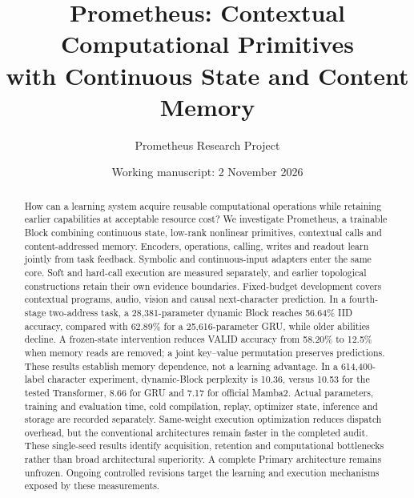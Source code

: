 \documentclass[10pt]{article}
\title{Prometheus: Contextual Computational Primitives\\with Continuous State and Content Memory}
\author{Prometheus Research Project}
\date{Working manuscript: 2 November 2026}
\begin{document}
\maketitle
\begin{abstract}
How can a learning system acquire reusable computational operations while
retaining earlier capabilities at acceptable resource cost? We investigate
Prometheus, a trainable Block combining continuous state, low-rank nonlinear
primitives, contextual calls and content-addressed memory. Encoders, operations,
calling, writes and readout learn jointly from task feedback. Symbolic and
continuous-input adapters enter the same core. Soft and hard-call execution
are measured separately, and earlier topological constructions retain their
own evidence boundaries. Fixed-budget development covers contextual programs,
audio, vision and causal next-character prediction. In a fourth-stage
two-address task, a 28,381-parameter dynamic Block reaches 56.64\% IID accuracy,
compared with 62.89\% for a 25,616-parameter GRU, while older abilities decline.
A frozen-state intervention reduces VALID accuracy from 58.20\% to 12.5\%
when memory reads are removed; a joint key--value permutation preserves
predictions. These results establish memory dependence, not a learning
advantage. In a 614,400-label character experiment, dynamic-Block perplexity
is 10.36, versus 10.53 for the tested Transformer, 8.66 for GRU and 7.17 for
official Mamba2. Actual parameters, training and evaluation time, cold
compilation, replay, optimizer state, inference and storage are recorded
separately. Same-weight execution optimization reduces dispatch overhead,
but the conventional architectures remain faster in the completed audit.
These single-seed results identify acquisition, retention and computational
bottlenecks rather than broad architectural superiority. A complete Primary
architecture remains unfrozen. Ongoing controlled revisions target the
learning and execution mechanisms exposed by these measurements.
\end{abstract}









\clearpage


\clearpage
\appendix

\end{document}
